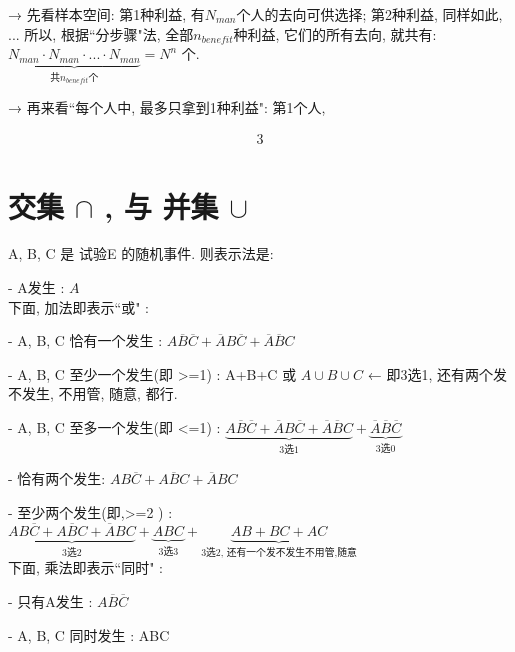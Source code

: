 \documentclass[UTF8]{ctexart}
\begin{document}
	→ 先看样本空间: 第1种利益, 有$N_{man}$个人的去向可供选择; 第2种利益, 同样如此, ... 所以, 根据``分步骤"法, 全部$n_{benefit}$种利益, 它们的所有去向, 就共有: $\underset{\text{共}n_{benefit}\text{个}}{\underbrace{N_{man}\cdot N_{man}\cdot ...\cdot N_{man}}}=N^n	$ 个.
	
	→ 再来看``每个人中, 最多只拿到1种利益": 第1个人,
	
	\begin{align*}  %
3
	\end{align*}
	
	
	

	
	
	
	\section{交集 $\cap$ , 与 并集 $\cup$}
	
	A, B, C 是 试验E 的随机事件. 则表示法是:
	
	- A发生 : $A$ \\
	
	下面, 加法即表示``或" :
	
	- A, B, C 恰有一个发生 : $A\overline{B}\overline{C}+\overline{A}B\overline{C}+\overline{A}\overline{B}C$
	
	- A, B, C 至少一个发生(即 >=1) : A+B+C 或 $A{\cup}B{\cup}C$ ← 即3选1, 还有两个发不发生, 不用管, 随意, 都行.
	
	- A, B, C 至多一个发生(即 <=1) : $\underset{3\text{选}1}{\underbrace{A\overline{B}\overline{C}+\overline{A}B\overline{C}+\overline{A}\overline{B}C}}+\underset{3\text{选}0}{\underbrace{\overline{A}\overline{B}\overline{C}}}		$
		
	- 恰有两个发生: $AB \overline{C} + A \overline{B} C + \overline{A} BC $
	
	- 至少两个发生(即,>=2 ) : $\underset{3\text{选}2}{\underbrace{AB\overline{C}+A\overline{B}C+\overline{A}BC}}+\underset{3\text{选}3}{\underbrace{ABC}}+\underset{3\text{选2,\ 还有一个发不发生不用管,随意}}{\underbrace{AB+BC+AC}}	$	\\
		
		

	下面, 乘法即表示``同时" :	
	
	- 只有A发生 : $A\overline{B}\overline{C}$	

	- A, B, C 同时发生 : ABC  \\
	
\end{document}
